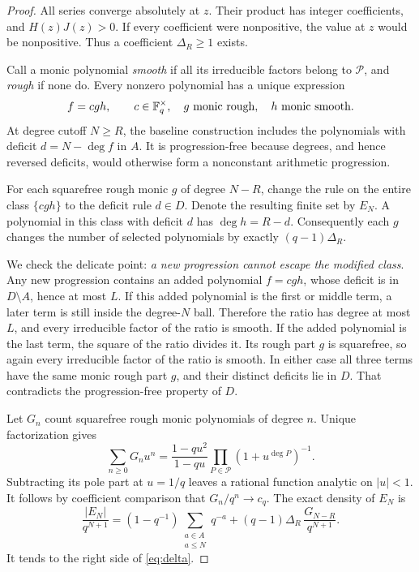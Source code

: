 \begin{proof}
All series converge absolutely at \(z\). Their product has integer
coefficients, and \(H(z)J(z)>0\). If every coefficient were nonpositive,
the value at \(z\) would be nonpositive. Thus a coefficient
\(\Delta_R\ge1\) exists.

Call a monic polynomial \emph{smooth} if all its irreducible factors belong
to \(\mathcal P\), and \emph{rough} if none do. Every nonzero polynomial has
a unique expression
\[
 f=cgh,\qquad c\in\mathbb F_q^\times,\quad g\text{ monic rough},\quad
 h\text{ monic smooth}.
\]
At degree cutoff \(N\ge R\), the baseline construction includes the
polynomials with deficit \(d=N-\deg f\) in \(A\). It is progression-free
because degrees, and hence reversed deficits, would otherwise form a
nonconstant arithmetic progression.

For each squarefree rough monic \(g\) of degree \(N-R\), change the rule
on the entire class \(\{cgh\}\) to the deficit rule \(d\in D\).
Denote the resulting finite set by \(E_N\). A polynomial in this class
with deficit \(d\) has \(\deg h=R-d\). Consequently each \(g\) changes
the number of selected polynomials by exactly
\((q-1)\Delta_R\).

We check the delicate point: \emph{a new progression cannot escape the
modified class}. Any new progression contains an added polynomial
\(f=cgh\), whose deficit is in \(D\setminus A\), hence at most \(L\).
If this added polynomial is the first or middle term, a later term is
still inside the degree-\(N\) ball. Therefore the ratio has degree at most
\(L\), and every irreducible factor of the ratio is smooth. If the added
polynomial is the last term, the square of the ratio divides it.
Its rough part \(g\) is squarefree, so again every irreducible factor
of the ratio is smooth. In either case all three terms have the same
monic rough part \(g\), and their distinct deficits lie in \(D\).
That contradicts the progression-free property of \(D\).

Let \(G_n\) count squarefree rough monic polynomials of degree \(n\).
Unique factorization gives
\[
 \sum_{n\ge0}G_nu^n
   =\frac{1-qu^2}{1-qu}
      \prod_{P\in\mathcal P}(1+u^{\deg P})^{-1}.
\]
Subtracting its pole part at \(u=1/q\) leaves a rational function analytic
on \(|u|<1\). It follows by coefficient comparison that
\(G_n/q^n\to c_q\). The exact density of \(E_N\) is
\[
 \frac{|E_N|}{q^{N+1}}
  =(1-q^{-1})\sum_{\substack{a\in A\\a\le N}}q^{-a}
      +(q-1)\Delta_R\,\frac{G_{N-R}}{q^{N+1}}.
\]
It tends to the right side of \eqref{eq:delta}.


\end{proof}
